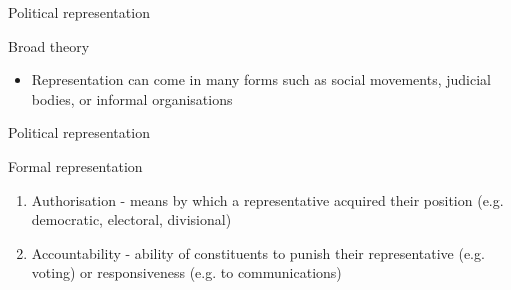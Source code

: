 \documentclass{beamer}
\begin{document}
\begin{frame}{Political representation} %
\onslide<+->\begin{block}{Broad theory}
\end{block}
\begin{itemize}
    \item Representation can come in many forms such as social movements, judicial bodies, or informal organisations %
\end{itemize}
\end{frame}

\begin{frame}{Political representation}
\onslide<+->\begin{block}{Formal representation}
\end{block}
\begin{enumerate}
    \item Authorisation - means by which a representative acquired their position (e.g. democratic, electoral, divisional)
    \item Accountability - ability of constituents to punish their representative (e.g. voting) or responsiveness (e.g. to communications)
\end{enumerate}
\end{frame}
\end{document}
